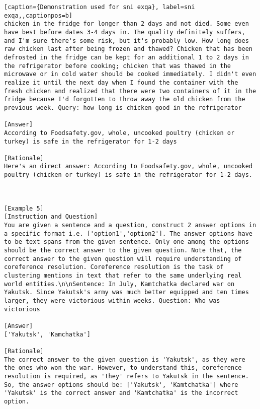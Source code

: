 \begin{lstlisting}[caption={Demonstration used for sni exqa}, label=sni exqa,,captionpos=b]
chicken in the fridge for longer than 2 days and not died. Some even have best before dates 3-4 days in. The quality definitely suffers, and I'm sure there's some risk, but it's probably low. How long does raw chicken last after being frozen and thawed? Chicken that has been defrosted in the fridge can be kept for an additional 1 to 2 days in the refrigerator before cooking; chicken that was thawed in the microwave or in cold water should be cooked immediately. I didn't even realize it until the next day when I found the container with the fresh chicken and realized that there were two containers of it in the fridge because I'd forgotten to throw away the old chicken from the previous week. Query: how long is chicken good in the refrigerator

[Answer]
According to Foodsafety.gov, whole, uncooked poultry (chicken or turkey) is safe in the refrigerator for 1-2 days

[Rationale]
Here's an direct answer: According to Foodsafety.gov, whole, uncooked poultry (chicken or turkey) is safe in the refrigerator for 1-2 days.



[Example 5]
[Instruction and Question]
You are given a sentence and a question, construct 2 answer options in a specific format i.e. ['option1','option2']. The answer options have to be text spans from the given sentence. Only one among the options should be the correct answer to the given question. Note that, the correct answer to the given question will require understanding of coreference resolution. Coreference resolution is the task of clustering mentions in text that refer to the same underlying real world entities.\n\nSentence: In July, Kamtchatka declared war on Yakutsk. Since Yakutsk's army was much better equipped and ten times larger, they were victorious within weeks. Question: Who was victorious

[Answer]
['Yakutsk', 'Kamchatka']

[Rationale]
The correct answer to the given question is 'Yakutsk', as they were the ones who won the war. However, to understand this, coreference resolution is required, as 'they' refers to Yakutsk in the sentence. So, the answer options should be: ['Yakutsk', 'Kamtchatka'] where 'Yakutsk' is the correct answer and 'Kamtchatka' is the incorrect option.




\end{lstlisting}

